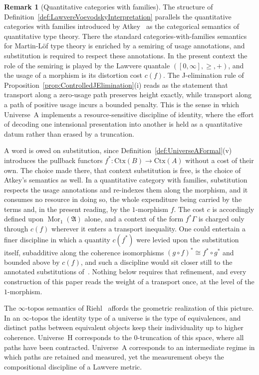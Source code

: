 \documentclass[10pt, reqno]{amsart}
\theoremstyle{plain}
\theoremstyle{definition}
\newtheorem{remark}[theorem]{Remark}
\theoremstyle{plain}
\begin{document}
\begin{remark}[Quantitative categories with families]\label{rem:QuantitativeCwF}
The structure of Definition~\ref{def:LawvereVoevodskyInterpretation} parallels the quantitative categories with families introduced by Atkey~\cite{Atkey2018} as the categorical semantics of quantitative type theory. There the standard categories-with-families semantics for Martin-L\"of type theory is enriched by a semiring of usage annotations, and substitution is required to respect these annotations. In the present context the role of the semiring is played by the Lawvere quantale $([0,\infty],\ge,+)$, and the usage of a morphism is its distortion cost $c(f)$. The J-elimination rule of Proposition~\ref{prop:ControlledJElimination}(i) reads as the statement that transport along a zero-usage path preserves height exactly, while transport along a path of positive usage incurs a bounded penalty. This is the sense in which Universe~A implements a resource-sensitive discipline of identity, where the effort of decoding one intensional presentation into another is held as a quantitative datum rather than erased by a truncation.

A word is owed on substitution, since Definition~\ref{def:UniverseAFormal}(v) introduces the pullback functors $f^\ast \colon \mathrm{Ctx}(B) \to \mathrm{Ctx}(A)$ without a cost of their own. The choice made there, that context substitution is free, is the choice of Atkey's semantics as well. In a quantitative category with families, substitution respects the usage annotations and re-indexes them along the morphism, and it consumes no resource in doing so, the whole expenditure being carried by the terms and, in the present reading, by the $1$-morphism $f$. The cost $c$ is accordingly defined upon $\operatorname{Mor}_1(\mathfrak{A})$ alone, and a context of the form $f^\ast\Gamma$ is charged only through $c(f)$ wherever it enters a transport inequality. One could entertain a finer discipline in which a quantity $c(f^\ast)$ were levied upon the substitution itself, subadditive along the coherence isomorphisms $(g \circ f)^\ast \cong f^\ast \circ g^\ast$ and bounded above by $c(f)$, and such a discipline would sit closer still to the annotated substitutions of~\cite{Atkey2018}. Nothing below requires that refinement, and every construction of this paper reads the weight of a transport once, at the level of the $1$-morphism.

The $\infty$-topos semantics of Riehl~\cite{Riehl2024} affords the geometric realization of this picture. In an $\infty$-topos the identity type of a universe is the type of equivalences, and distinct paths between equivalent objects keep their individuality up to higher coherence. Universe~H corresponds to the $0$-truncation of this space, where all paths have been contracted. Universe~A corresponds to an intermediate regime in which paths are retained and measured, yet the measurement obeys the compositional discipline of a Lawvere metric.
\end{remark}
\end{document}
